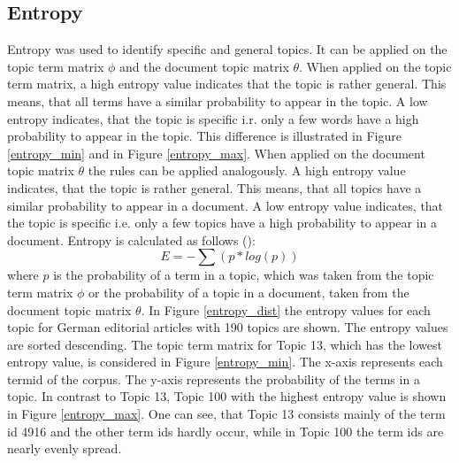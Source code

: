 \newpage
\subsection{Entropy}
Entropy was used to identify specific and general topics. It can be applied on the topic term matrix $\phi$ and the document topic matrix $\theta$. When applied on the topic term matrix, a high entropy value indicates that the topic is rather general. This means, that all terms have a similar probability to appear in the topic. A low entropy indicates, that the topic is specific i.r. only a few words have a high probability to appear in the topic. This difference is illustrated in Figure  \ref{entropy_min} and in Figure \ref{entropy_max}. \newline
When applied on the document topic matrix $\theta$ the rules can be applied analogously. A high entropy value indicates, that the topic is rather general. This means, that all topics have a similar probability to appear in a document. A low entropy value indicates, that the topic is specific i.e. only a few topics have a high probability to appear in a document. Entropy is calculated as follows (\cite{Sethi2012}):
\begin{equation}
E = -\sum(p * log(p))
\end{equation}
where $p$ is the probability of a term in a topic, which was taken from the topic term matrix $\phi$ or the probability of a topic in a document, taken from the document topic matrix $\theta$. 
In Figure \ref{entropy_dist} the entropy values for each topic for German editorial articles with 190 topics are shown. The entropy values are sorted descending. The topic term matrix for Topic 13, which has the lowest entropy value, is considered in Figure \ref{entropy_min}. The x-axis represents each termid of the corpus. The y-axis represents the probability of the terms in a topic. In contrast to Topic 13, Topic 100 with the highest entropy value is shown in Figure \ref{entropy_max}. One can see, that Topic 13 consists mainly of the term id 4916 and the other term ids hardly occur, while in Topic 100 the term ids are nearly evenly spread.
